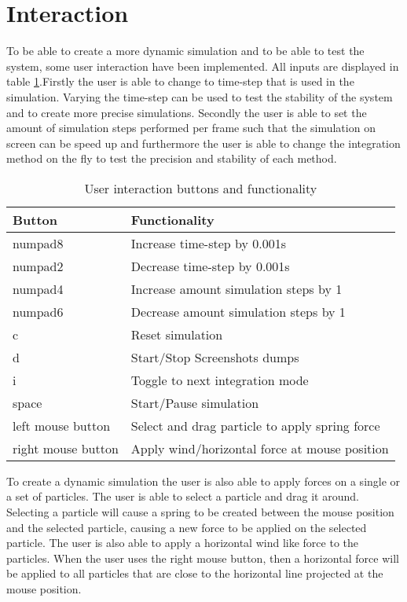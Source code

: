 \section{Interaction}
To be able to create a more dynamic simulation and to be able to test the system, some user interaction have been implemented. All inputs are displayed in table \ref{tab:input}.Firstly the user is able to change to time-step that is used in the simulation. Varying the time-step can be used to test the stability of the system and to create more precise simulations. Secondly the user is able to set the amount of simulation steps performed per frame such that the simulation on screen can be speed up and furthermore the user is able to change the integration method on the fly to test the precision and stability of each method.\\
\begin{table}[h]
\begin{tabular}{l|l}
  \bf{Button} & \bf{Functionality} \\ \hline
  numpad8 & Increase time-step by 0.001s \\
  numpad2 & Decrease time-step by 0.001s \\
  numpad4 & Increase amount simulation steps by 1 \\
  numpad6 & Decrease amount simulation steps by 1  \\
  c & Reset simulation \\
  d & Start/Stop Screenshots dumps \\
  i & Toggle to next integration mode \\
  space &  Start/Pause simulation\\
  left mouse button & Select and drag particle to apply spring force \\
  right mouse button & Apply wind/horizontal force at mouse position
\end{tabular}
\caption{User interaction buttons and functionality}
\label{tab:input}
\end{table} 
To create a dynamic simulation the user is also able to apply forces on a single or a set of particles. The user is able to select a particle and drag it around. Selecting a particle will cause a spring to be created between the mouse position and the selected particle, causing a new force to be applied on the selected particle. The user is also able to apply a horizontal wind like force to the particles. When the user uses the right mouse button, then a horizontal force will be applied to all particles that are close to the horizontal line projected at the mouse position.